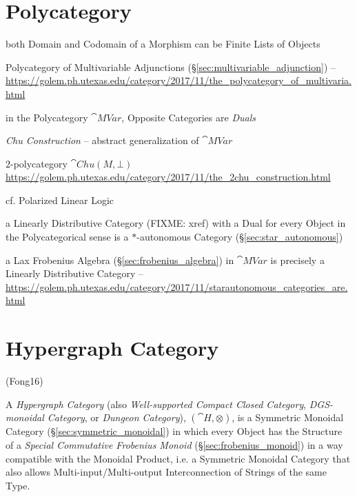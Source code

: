\section{Polycategory}\label{sec:polycategory}

both Domain and Codomain of a Morphism can be Finite Lists of Objects

Polycategory of Multivariable Adjunctions
(\S\ref{sec:multivariable_adjunction}) --
\url{https://golem.ph.utexas.edu/category/2017/11/the_polycategory_of_multivaria.html}

in the Polycategory $\cat{MVar}$, Opposite Categories are \emph{Duals}


\emph{Chu Construction} -- abstract generalization of $\cat{MVar}$

$2$-polycategory $\cat{Chu}(M,\bot)$
\url{https://golem.ph.utexas.edu/category/2017/11/the_2chu_construction.html}

cf. Polarized Linear Logic

a Linearly Distributive Category (FIXME: xref) with a Dual for every Object in
the Polycategorical sense is a $*$-autonomous Category
(\S\ref{sec:star_autonomous})

a Lax Frobenius Algebra (\S\ref{sec:frobenius_algebra}) in $\cat{MVar}$ is
precisely a Linearly Distributive Category
--\url{https://golem.ph.utexas.edu/category/2017/11/starautonomous_categories_are.html}



\section{Hypergraph Category}\label{sec:hypergraph_category}

(Fong16)

A \emph{Hypergraph Category} (also \emph{Well-supported Compact Closed
  Category}, \emph{DGS-monoidal Category}, or \emph{Dungeon
  Category}), $(\cat{H}, \otimes)$, is a Symmetric Monoidal Category
(\S\ref{sec:symmetric_monoidal}) in which every Object has the
Structure of a \emph{Special Commutative Frobenius Monoid}
(\S\ref{sec:frobenius_monoid}) in a way compatible with the Monoidal
Product, i.e. a Symmetric Monoidal Category that also allows
Multi-input/Multi-output Interconnection of Strings of the same Type.

